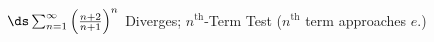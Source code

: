 {$\ds\sum_{n=1}^\infty \left(\frac{n+2}{n+1}\right)^n$
}
{Diverges; $n^\text{th}$-Term Test ($n^\text{th}$ term approaches $e$.)
}